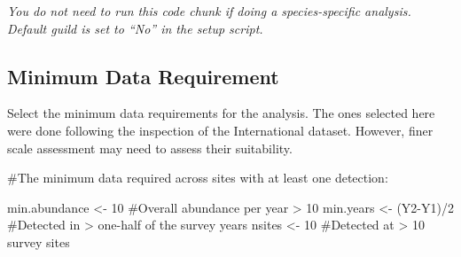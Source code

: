 \documentclass[
  letterpaper,
  DIV=11,
  numbers=noendperiod]{scrreprt}
\newenvironment{Shaded}{\begin{snugshade}}{\end{snugshade}}
\newcommand{\CommentTok}[1]{\textcolor[rgb]{0.37,0.37,0.37}{#1}}
\newcommand{\DecValTok}[1]{\textcolor[rgb]{0.68,0.00,0.00}{#1}}
\newcommand{\FunctionTok}[1]{\textcolor[rgb]{0.28,0.35,0.67}{#1}}
\newcommand{\NormalTok}[1]{\textcolor[rgb]{0.00,0.23,0.31}{#1}}
\newcommand{\OtherTok}[1]{\textcolor[rgb]{0.00,0.23,0.31}{#1}}
\newcommand{\SpecialCharTok}[1]{\textcolor[rgb]{0.37,0.37,0.37}{#1}}
\newcommand{\StringTok}[1]{\textcolor[rgb]{0.13,0.47,0.30}{#1}}
\begin{document}
\emph{You do not need to run this code chunk if doing a species-specific
analysis. Default guild is set to ``No'' in the setup script.}

\begin{Shaded}
\end{Shaded}

\subsection{Minimum Data Requirement}\label{3.1.3Analysis}

Select the minimum data requirements for the analysis. The ones selected
here were done following the inspection of the International dataset.
However, finer scale assessment may need to assess their suitability.

\begin{Shaded}
\begin{Highlighting}[]
\CommentTok{\#The minimum data required across sites with at least one detection:}

\NormalTok{min.abundance }\OtherTok{\textless{}{-}} \DecValTok{10} \CommentTok{\#Overall abundance per year \textgreater{} 10}
\NormalTok{min.years }\OtherTok{\textless{}{-}}\NormalTok{ (Y2}\SpecialCharTok{{-}}\NormalTok{Y1)}\SpecialCharTok{/}\DecValTok{2} \CommentTok{\#Detected in \textgreater{} one{-}half of the survey years}
\NormalTok{nsites }\OtherTok{\textless{}{-}} \DecValTok{10} \CommentTok{\#Detected at \textgreater{} 10 survey sites}
\end{Highlighting}
\end{Shaded}
\end{document}
